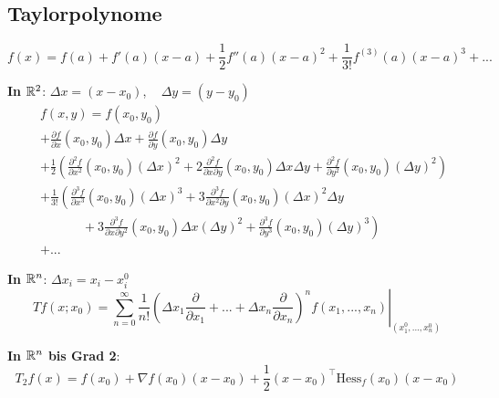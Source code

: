 \subsection{Taylorpolynome}

\[
    f(x) = f(a) + f'(a)(x-a) + \frac{1}{2} f''(a)(x-a)^2 + \frac{1}{3!} f^{(3)}(a)(x-a)^3 + ...
\]

\textbf{In $\mathbb{R}^2$}: $\Delta x = (x - x_0)$, ~ $\Delta y = (y - y_0)$
\begin{align*}
    \; & f(x, y) =f(x_0, y_0)\\ &+ \frac{\partial f}{\partial x}(x_0,y_0) \Delta x + \frac{\partial f}{\partial y}(x_0,y_0) \Delta y\\
    &+ \frac{1}{2} \left(\frac{\partial^2 f}{\partial x^2}(x_0,y_0) (\Delta x)^2 + 2\frac{\partial^2 f}{\partial x \partial y}(x_0,y_0) \Delta x \Delta y + \frac{\partial^2 f}{\partial y^2}(x_0,y_0) (\Delta y)^2\right)\\
    &+ \frac{1}{3!} \left(\frac{\partial^3 f}{\partial x^3}(x_0,y_0) (\Delta x)^3 + 3\frac{\partial^3 f}{\partial x^2 \partial y}(x_0,y_0) (\Delta x)^2 \Delta y\right.\\
    &\quad\quad\quad\;+ \left.3\frac{\partial^3 f}{\partial x \partial y^2}(x_0,y_0) \Delta x (\Delta y)^2 + \frac{\partial^3 f}{\partial y^3}(x_0,y_0) (\Delta y)^3\right)\\
    & + ...
\end{align*}

\textbf{In $\mathbb{R}^n$}: $\Delta x_i = x_i - x_i^0$
\[
	Tf(x;x_0) = \left.\sum_{n=0}^\infty \frac{1}{n!}\left(\Delta x_1 \frac{\partial}{\partial x_1} + ... + \Delta x_n \frac{\partial}{\partial x_n} \right)^n 
		f(x_1, ..., x_n)\right|_{(x_1^0,...,x_n^0)}
\]

\textbf{In $\mathbb{R}^n$ bis Grad 2}:
\[
    T_2f(x) = f(x_0) + \nabla f(x_0)	 (x-x_0) + \frac{1}{2} (x-x_0)^\top \text{Hess}_f(x_0) (x-x_0) 
\]


